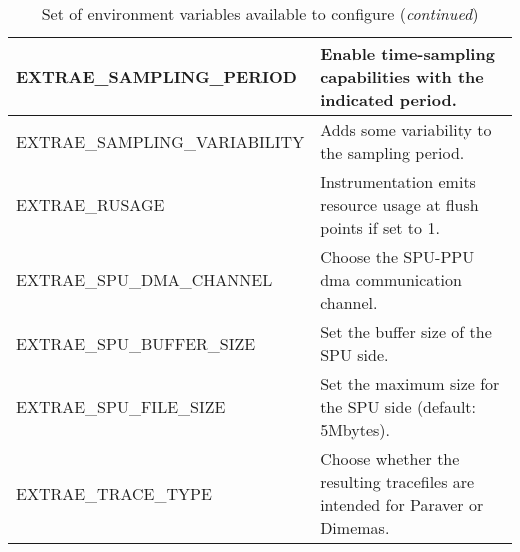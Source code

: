 \begin{landscape}
\begin{table}
{\begin{tabular}{| p{7cm} | p{14cm} |}
  \hline
  EXTRAE\_SAMPLING\_PERIOD & Enable time-sampling capabilities with the indicated period.\\
  \hline
  EXTRAE\_SAMPLING\_VARIABILITY & Adds some variability to the sampling period.\\
  \hline
  EXTRAE\_RUSAGE & Instrumentation emits resource usage at flush points if set to 1.\\
  \hline
  EXTRAE\_SPU\_DMA\_CHANNEL & Choose the SPU-PPU dma communication channel.\\
  \hline
  EXTRAE\_SPU\_BUFFER\_SIZE & Set the buffer size of the SPU side.\\
  \hline 
  EXTRAE\_SPU\_FILE\_SIZE & Set the maximum size for the SPU side (default: 5Mbytes).\\
  \hline
  EXTRAE\_TRACE\_TYPE & Choose whether the resulting tracefiles are intended for Paraver or Dimemas.\\
  \hline
\end{tabular}
}
\caption{Set of environment variables available to configure \TRACE ({\em continued})}
\label{tab:EnvironmentVariables_continued}
\end{table}

\end{landscape}
